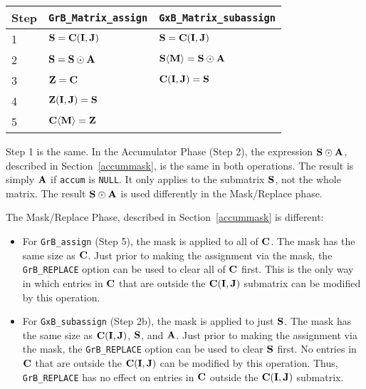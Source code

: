 \documentclass[12pt]{article}
\begin{document}
{\vspace{0.1in}
\begin{tabular}{lll}
\hline
Step & \verb'GrB_Matrix_assign'                & \verb'GxB_Matrix_subassign'                        \\
\hline
1 & ${\bf S} = {\bf C(I,J)}$                & ${\bf S} = {\bf C(I,J)}$                              \\
2 & ${\bf S} = {\bf S} \odot {\bf A}$       & ${\bf S \langle M \rangle} = {\bf S} \odot {\bf A}$   \\
3 & ${\bf Z} = {\bf C}$                     & ${\bf C(I,J)}= {\bf S}$                               \\
4 & ${\bf Z(I,J)} = {\bf S}$                &                                                       \\
5 & ${\bf C \langle M \rangle = Z}$         &                                                       \\
\hline
\end{tabular}
\vspace{0.1in}

Step 1 is the same.  In the Accumulator Phase (Step 2), the expression
${\bf S} \odot {\bf A}$,
described in Section~\ref{accummask}, is the same in both
operations.  The result is simply ${\bf A}$ if \verb'accum' is \verb'NULL'.  It
only applies to the submatrix ${\bf S}$, not the whole matrix.
The result ${\bf S} \odot {\bf A}$ is used differently in the Mask/Replace
phase.

The Mask/Replace Phase, described in Section~\ref{accummask} is different:
\begin{itemize}
\item
    For \verb'GrB_assign' (Step 5), the mask is applied to all of ${\bf
    C}$.  The mask has the same size as ${\bf C}$.  Just prior to making the
    assignment via the mask, the \verb'GrB_REPLACE' option can be used to clear
    all of ${\bf C}$ first.  This is the only way in which entries in ${\bf C}$ that
    are outside the ${\bf C(I,J)}$ submatrix can be modified by this operation.

\item
    For \verb'GxB_subassign' (Step 2b), the mask is applied to just
    ${\bf S}$.  The mask has the same size as ${\bf C(I,J)}$, ${\bf S}$, and
    ${\bf A}$.  Just prior to making the assignment via the mask, the
    \verb'GrB_REPLACE' option can be used to clear ${\bf S}$ first.  No entries
    in ${\bf C}$ that are outside the ${\bf C(I,J)}$ can be modified by this
    operation.  Thus, \verb'GrB_REPLACE' has no effect on entries in ${\bf C}$
    outside the ${\bf C(I,J)}$ submatrix.


\end{itemize}}
\end{document}
